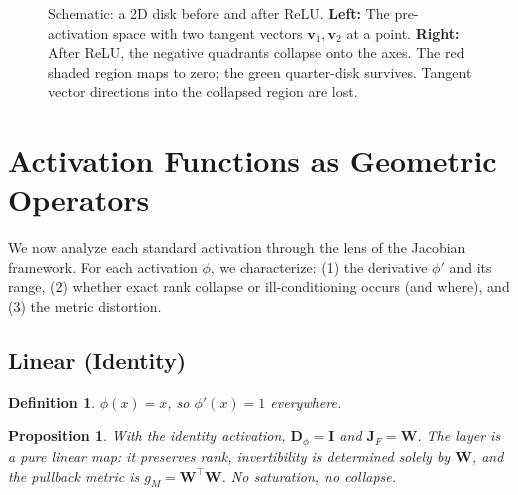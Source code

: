 \documentclass[11pt,a4paper]{article}
\newtheorem{proposition}[theorem]{Proposition}
\newtheorem{definition}[theorem]{Definition}
\theoremstyle{remark}
\begin{document}
\begin{figure}[ht]
\caption{Schematic: a 2D disk before and after ReLU.
\textbf{Left:} The pre-activation space with two tangent vectors $\mathbf{v}_1, \mathbf{v}_2$ at a point.
\textbf{Right:} After ReLU, the negative quadrants collapse onto the axes.
The \textcolor{accent}{red shaded region} maps to zero; the \textcolor{accentgreen}{green quarter-disk} survives.
Tangent vector directions into the collapsed region are lost.}
\label{fig:relu-collapse}
\end{figure}

\section{Activation Functions as Geometric Operators}
\label{sec:activations}

We now analyze each standard activation through the lens of the Jacobian framework.
For each activation $\phi$, we characterize: (1) the derivative $\phi'$ and its range, (2) whether exact rank collapse or ill-conditioning occurs (and where), and (3) the metric distortion.

\subsection{Linear (Identity)}

\begin{definition}
$\phi(x) = x$, so $\phi'(x) = 1$ everywhere.
\end{definition}

\begin{proposition}
With the identity activation, $\mathbf{D}_\phi = \mathbf{I}$ and $\mathbf{J}_F = \mathbf{W}$.  The layer is a pure linear map: it preserves rank, invertibility is determined solely by $\mathbf{W}$, and the pullback metric is $g_M = \mathbf{W}^\top \mathbf{W}$.  No saturation, no collapse.
\end{proposition}
\end{document}
